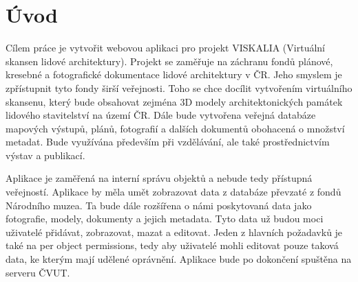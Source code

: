 \chapter*{Úvod}
\label{0-uvod}

Cílem práce je vytvořit webovou aplikaci pro projekt VISKALIA
(Virtuální skansen lidové architektury). Projekt se zaměřuje na
záchranu fondů plánové, kresebné a fotografické dokumentace lidové
architektury v ČR. Jeho smyslem je zpřístupnit tyto fondy širší
veřejnosti. Toho se chce docílit vytvořením virtuálního skansenu,
který bude obsahovat zejména 3D modely architektonických památek
lidového stavitelství na území ČR. Dále bude vytvořena veřejná
databáze mapových výstupů, plánů, fotografií a dalších dokumentů
obohacená o množství metadat. Bude využívána především při vzdělávání,
ale také prostřednictvím výstav a publikací.

Aplikace je zaměřená na interní správu objektů a nebude tedy přístupná
veřejností. Aplikace by měla umět zobrazovat data z databáze převzaté
z fondů Národního muzea. Ta bude dále rozšířena o námi poskytovaná
data jako fotografie, modely, dokumenty a jejich metadata. Tyto data
už budou moci uživatelé přidávat, zobrazovat, mazat a editovat. Jeden
z hlavních požadavků je také na per object permissions, tedy aby
uživatelé mohli editovat pouze taková data, ke kterým mají udělené
oprávnění. Aplikace bude po dokončení spuštěna na serveru ČVUT.


